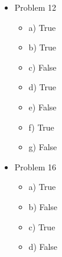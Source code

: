 \documentclass[10pt,a4paper]{article}
\begin{document}
\begin{itemize}
\begin{itemize}
    \item Problem 12
    \begin{itemize}
      \item a) True
      \item b) True
      \item c) False
      \item d) True
      \item e) False
      \item f) True
      \item g) False
      \end{itemize}
    \item Problem 16
    \begin{itemize}
      \item a) True 
      \item b) False
      \item c) True
      \item d) False
    \end{itemize}
  \end{itemize}
\end{itemize}
\end{document}
